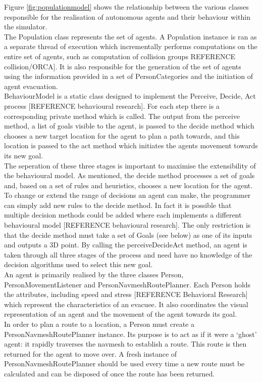 Figure \ref{fig:populationmodel} shows the relationship between the various classes responsible
for the realisation of autonomous agents and their behaviour within the simulator.
\\
The Population class represents the set of agents. A Population instance is ran as a separate thread of execution which
incrementally performs computations on the entire set of agents, such as computation of collision groups {REFERENCE collision/ORCA]. It is also responsible
for the generation of the set of agents using the information provided in a set of PersonCategories and the initiation
of agent evacuation.
\\
BehaviourModel is a static class designed to implement the Perceive, Decide, Act process [REFERENCE behavioural research]. For each step there is a corresponding 
private method which is called. The output from the perceive method, a list of goals visible to the agent, is passed to the decide method
which chooses a new target location for the agent to plan a path towards, and this location is passed to the act method which initiates the agents
movement towards its new goal.
\\
The seperation of these three stages is important to maximise the extensibility of the behavioural model. As mentioned, the decide method processes a set of
goals and, based on a set of rules and heuristics, chooses a new location for the agent. To change or extend the range of decisions an agent can make,
the programmer can simply add new rules to the decide method. In fact it is possible that multiple decision methods could be added where each implements
a different behavioural model [REFERENCE behavioural research]. The only restriction is that the decide method must take a set of Goals (see below) as one of its inputs and outputs a 3D point.
By calling the perceiveDecideAct method, an agent is taken through all three stages of the process and need have no knowledge of the decision algorithms used to select this new goal.
\\

An agent is primarily realised by the three classes Person, PersonMovementListener and PersonNavmeshRoutePlanner. 
Each Person holds the attributes, including speed and stress [REFERENCE Behavioral Research] which represent the characteristics of 
an evacuee. It also coordinates the visual representation of an agent and the movement of the agent towards its goal.
\\
In order to plan a route to a location, a Person must create a PersonNavmeshRoutePlanner instance. Its purpose is to act 
as if it were a `ghost' agent: it rapidly traverses the navmesh to establish a route. This route is then returned for the 
agent to move over. A fresh instance of PersonNavmeshRoutePlanner should be used every time a new route must be calculated and can be disposed
of once the route has been returned.
}
